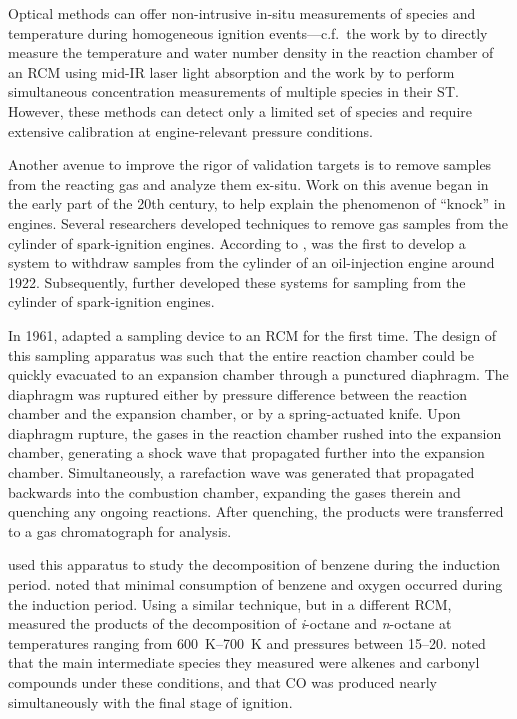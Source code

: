\documentclass[../main.tex]{subfiles}
\begin{document}
Optical methods can offer non-intrusive in-situ measurements of species
and temperature during homogeneous ignition events---c.f.\ the work by
\textcite{Das2012a, Uddi2012} to directly measure the temperature and
water number density in the reaction chamber of an RCM using mid-IR
laser light absorption and the work by \textcite{Stranic2013} to perform
simultaneous concentration measurements of multiple species in their
ST. However, these methods can detect only a limited set of
species and require extensive calibration at engine-relevant pressure
conditions.

Another avenue to improve the rigor of validation targets is to remove
samples from the reacting gas and analyze them ex-situ. Work on this
avenue began in the early part of the 20th century, to help explain the
phenomenon of ``knock'' in engines. Several researchers developed
techniques to remove gas samples from the cylinder of spark-ignition
engines. According to \textcite{Withrow1930}, \textcite{Brooks1922} was
the first to develop a system to withdraw samples from the cylinder of
an oil-injection engine around 1922. Subsequently, \textcite{Callendar1926,
Egerton1926, Lovell1927, Ricardo1928, Withrow1930, Steele1933, Egerton1935,
Downs1951, Pahnke1954} further developed these systems for sampling from
the cylinder of spark-ignition engines.

In 1961, \textcite{Roblee1961} adapted a sampling device to an RCM for
the first time. The design of this sampling apparatus was such that the
entire reaction chamber could be quickly evacuated to an expansion chamber
through a punctured diaphragm. The diaphragm was ruptured either by
pressure difference between the reaction chamber and the expansion
chamber, or by a spring-actuated knife. Upon diaphragm rupture, the
gases in the reaction chamber rushed into the expansion chamber,
generating a shock wave that propagated further into the expansion
chamber. Simultaneously, a rarefaction wave was generated that
propagated backwards into the combustion chamber, expanding the gases
therein and quenching any ongoing reactions. After quenching, the
products were transferred to a gas chromatograph for analysis.

\textcite{Roblee1961} used this apparatus to study the decomposition of
benzene during the induction period. \textcite{Roblee1961} noted that minimal
consumption of benzene and oxygen occurred during the induction period.
Using a similar technique, but in a different RCM, \textcite{Martinengo1965}
measured the products of the decomposition of \textit{i}-octane and
\textit{n}-octane at temperatures ranging from \SIrange{600}{700}{\kelvin}
and pressures between \SIrange{15}{20}{\atmosphere}. \textcite{Martinengo1965}
noted that the main intermediate species they measured were alkenes and carbonyl
compounds under these conditions, and that CO was produced nearly simultaneously
with the final stage of ignition.
\end{document}
